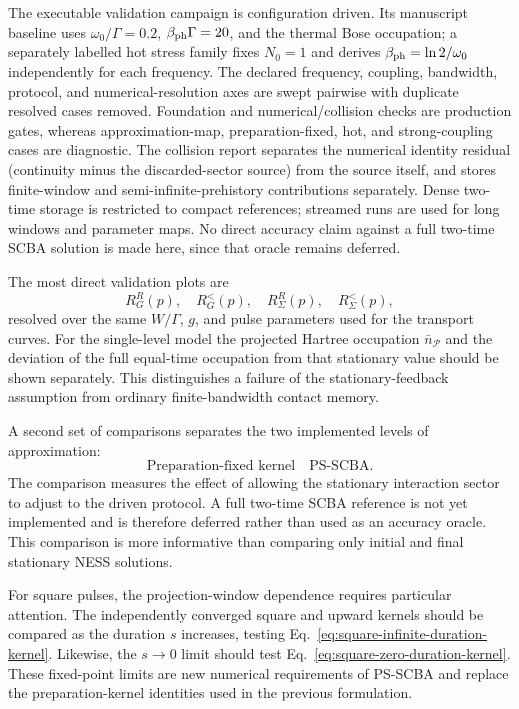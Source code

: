 \documentclass[
 reprint,
 superscriptaddress,
 amsmath,amssymb,
 aps,prb,
 longbibliography,
 floatfix
]{revtex4-2}
\begin{document}
The executable validation campaign is configuration driven.  Its manuscript
baseline uses $\omega_0/\Gamma=0.2$, $\beta_{\rm ph}\Gamma=20$, and the
thermal Bose occupation; a separately labelled hot stress family fixes
$N_0=1$ and derives $\beta_{\rm ph}=\ln 2/\omega_0$ independently for each
frequency.  The declared frequency, coupling, bandwidth, protocol, and
numerical-resolution axes are swept pairwise with duplicate resolved cases
removed.  Foundation and numerical/collision checks are production gates,
whereas approximation-map, preparation-fixed, hot, and strong-coupling cases
are diagnostic.  The collision report separates the numerical identity
residual (continuity minus the discarded-sector source) from the source itself,
and stores finite-window and semi-infinite-prehistory contributions separately.
Dense two-time storage is restricted to compact references; streamed runs are
used for long windows and parameter maps.  No direct accuracy claim against a
full two-time SCBA solution is made here, since that oracle remains deferred.

The most direct validation plots are
\begin{equation*}
R_G^{R}(p),\quad
R_G^{<}(p),\quad
R_\Sigma^{R}(p),\quad
R_\Sigma^{<}(p),
\end{equation*}
resolved over the same \(W/\Gamma\), \(g\), and pulse parameters used for the transport curves. For the single-level model the projected Hartree occupation
\(\bar n_{\mathcal P}\)
and the deviation of the full equal-time occupation from that stationary value should be shown separately. This distinguishes a failure of the stationary-feedback assumption from ordinary finite-bandwidth contact memory.

A second set of comparisons separates the two implemented levels of approximation:
\begin{equation*}
\text{Preparation-fixed kernel}
\quad
\text{PS-SCBA}.
\end{equation*}
The comparison measures the effect of allowing the stationary interaction sector
to adjust to the driven protocol.  A full two-time SCBA reference is not yet
implemented and is therefore deferred rather than used as an accuracy oracle.
This comparison is more informative than comparing only initial and final
stationary NESS solutions.

For square pulses, the projection-window dependence requires particular attention. The independently converged square and upward kernels should be compared as the duration \(s\) increases, testing Eq.~\eqref{eq:square-infinite-duration-kernel}. Likewise, the \(s\to0\) limit should test Eq.~\eqref{eq:square-zero-duration-kernel}. These fixed-point limits are new numerical requirements of PS-SCBA and replace the preparation-kernel identities used in the previous formulation.
\end{document}

